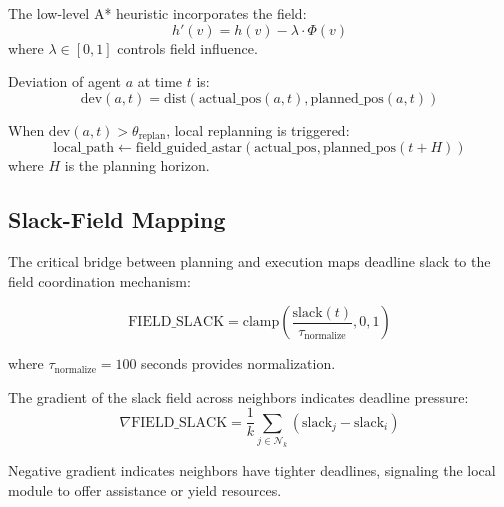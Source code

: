 \begin{definition}
The low-level A* heuristic incorporates the field:
\begin{equation}
h'(v) = h(v) - \lambda \cdot \Phi(v)
\end{equation}
where $\lambda \in [0, 1]$ controls field influence.
\end{definition}

\begin{definition}
Deviation of agent $a$ at time $t$ is:
\begin{equation}
\text{dev}(a, t) = \text{dist}(\text{actual\_pos}(a, t), \text{planned\_pos}(a, t))
\end{equation}
\end{definition}

When $\text{dev}(a, t) > \theta_{\text{replan}}$, local replanning is triggered:
\begin{equation}
\text{local\_path} \leftarrow \text{field\_guided\_astar}(\text{actual\_pos}, \text{planned\_pos}(t + H))
\end{equation}
where $H$ is the planning horizon.

\subsection{Slack-Field Mapping}

The critical bridge between planning and execution maps deadline slack to the \ekkor{} field coordination mechanism:

\begin{equation}
\text{FIELD\_SLACK} = \text{clamp}\left(\frac{\text{slack}(t)}{\tau_{\text{normalize}}}, 0, 1\right)
\end{equation}

where $\tau_{\text{normalize}} = 100$ seconds provides normalization.

The gradient of the slack field across neighbors indicates deadline pressure:
\begin{equation}
\nabla\text{FIELD\_SLACK} = \frac{1}{k}\sum_{j \in \mathcal{N}_k} (\text{slack}_j - \text{slack}_i)
\end{equation}

Negative gradient indicates neighbors have tighter deadlines, signaling the local module to offer assistance or yield resources.
